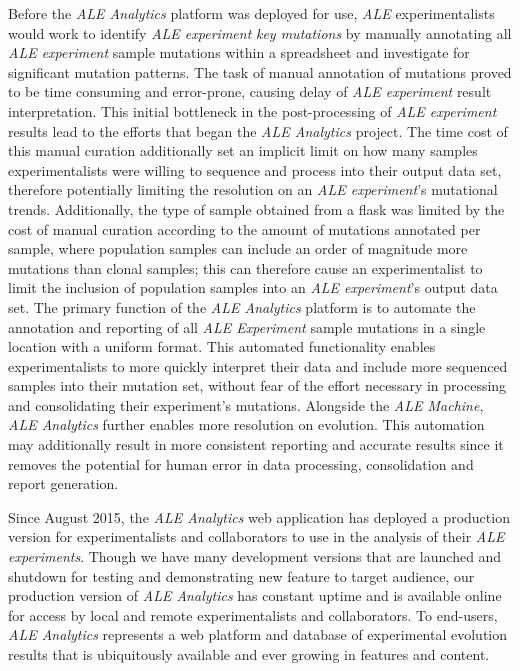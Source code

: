 \documentclass[12pt,final,masters,chapterheads]{ucsd}  %
\begin{document}
%
%
Before the \textit{ALE Analytics} platform was deployed for use, \textit{ALE} experimentalists would work to identify \textit{ALE experiment} \textit{key mutations} by manually annotating all \textit{ALE experiment} sample mutations within a spreadsheet and investigate for significant mutation patterns. The task of manual annotation of mutations proved to be time consuming and error-prone, causing delay of \textit{ALE experiment} result interpretation. This initial bottleneck in the post-processing of \textit{ALE experiment} results lead to the efforts that began the \textit{ALE Analytics} project. The time cost of this manual curation additionally set an implicit limit on how many samples experimentalists were willing to sequence and process into their output data set, therefore potentially limiting the resolution on an \textit{ALE experiment}'s mutational trends. Additionally, the type of sample obtained from a flask was limited by the cost of manual curation according to the amount of mutations annotated per sample, where population samples can include an order of magnitude more mutations than clonal samples; this can therefore cause an experimentalist to limit the inclusion of population samples into an \textit{ALE experiment}'s output data set. The primary function of the \textit{ALE Analytics} platform is to automate the annotation and reporting of all \textit{ALE Experiment} sample mutations in a single location with a uniform format. This automated functionality enables experimentalists to more quickly interpret their data and include more sequenced samples into their mutation set, without fear of the effort necessary in processing and consolidating their experiment's mutations. Alongside the \textit{ALE Machine}, \textit{ALE Analytics} further enables more resolution on evolution. This automation may additionally result in more  consistent reporting and accurate results since it removes the potential for human error in data processing, consolidation and report generation.

Since August 2015, the\textit{ ALE Analytics} web application has deployed a production version for experimentalists and collaborators to use in the analysis of their \textit{ALE experiments}. Though we have many development versions that are launched and shutdown for testing and demonstrating new feature to target audience, our production version of\textit{ ALE Analytics} has constant uptime and is available online for access by local and remote experimentalists and collaborators. To end-users, \textit{ALE Analytics} represents a web platform and database of experimental evolution results that is ubiquitously available and ever growing in features and content.
\end{document}
